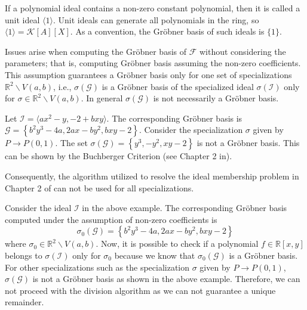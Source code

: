 \documentclass[runningheads]{llncs}
\newcommand{\Rr}{\mathbb{R}}
\newcommand{\1}{\chi}
\newcommand{\Ff}{\mathcal{F}}
\newcommand{\Gg}{\mathcal{G}}
\newcommand{\Ii}{\mathcal{I}}
\begin{document}
\begin{remark}
    If a polynomial ideal contains a non-zero constant polynomial, then it is called a unit ideal $\langle 1\rangle$.
   Unit ideals can generate all polynomials in the ring, so $\langle 1\rangle=\mathcal{K}[A][X]$.
    As a convention, the Gr{\"o}bner basis of such ideals is $\{1\}$.
\end{remark}
   
Issues arise when computing the Gr{\"o}bner basis of $\Ff$ without considering the parameters; that is, 
computing Gr{\"o}bner basis assuming the non-zero coefficients.
This assumption guarantees a Gr{\"o}bner basis only for one set of specializations $\Rr^2\backslash V(a,b)$, i.e., 
$\sigma(\Gg)$ is a Gr{\"o}bner basis of the specialized ideal $\sigma(\Ii)$ only for $\sigma \in \Rr^2\backslash V(a,b)$.
In general $\sigma\left(\Gg\right)$ is not necessarily a Gr{\"o}bner basis.
    \begin{example}
        \label{ex431}
        Let $\Ii=\langle 
           {a x^2 - y, -2 + b x y} \rangle$. The corresponding Gr{\"o}bner basis 
           is $\Gg=\left\{b^2 y^3-4 a,2 a x-b y^2,b x y-2\right\}$. Consider 
           the specialization $\sigma$ given by $P\rightarrow P(0,1)$.
           The set $\sigma(\Gg)=\left\{y^3,-y^2,x y-2\right\}$ is not a Gr{\"o}bner basis.
		   This can be shown by the Buchberger Criterion (see Chapter 2 in\cite{Cox}).

    \end{example}

Consequently, the algorithm utilized to resolve the ideal membership 
    problem in Chapter 2 of \cite{Cox} can not be used for all specializations. 
    
    \begin{example}
        \label{ex433}
        Consider the ideal $\Ii$ in the above example. The corresponding Gr{\"o}bner basis computed under the assumption of non-zero coefficients
        is $$\sigma_0(\Gg)=\left\{b^2 y^3-4 a,2 a x-b y^2,b x y-2\right\}$$ where $\sigma_0 \in \Rr^2\backslash V(a,b)$. 
        Now, it is possible to check if a polynomial $f\in \Rr[x,y]$ belongs to $\sigma(\Ii)$ only for $\sigma_0 $     
        because we know that $\sigma_0(\Gg)$ is a Gr{\"o}bner basis. For other specializations such as 
        the specialization $\sigma$ given by $P\rightarrow P(0,1)$, $\sigma(\Gg)$ is not a Gr{\"o}bner basis as shown in the above example. 
        Therefore, we can not proceed with the division algorithm as we can not guarantee a unique remainder.%
    \end{example}
\end{document}
